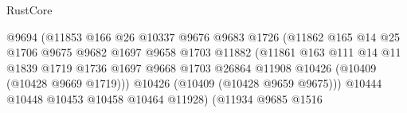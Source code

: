 \begin{lexlean}{RustCore}
\begin{coremodule}
                                                @9694
                                                (@11853
                                                  @166
                                                  @26
                                                  @10337
                                                  @9676
                                                  @9683
                                                  @1726
                                                  (@11862
                                                    @165
                                                    @14
                                                    @25
                                                    @1706
                                                    @9675
                                                    @9682
                                                    @1697
                                                    @9658
                                                    @1703
                                                    @11882
                                                    (@11861
                                                      @163
                                                      @111
                                                      @14
                                                      @11
                                                      @1839
                                                      @1719
                                                      @1736
                                                      @1697
                                                      @9668
                                                      @1703
                                                      @26864
                                                      @11908
                                                      @10426
                                                      (@10409 (@10428 @9669 @1719)))
                                                    @10426
                                                    (@10409 (@10428 @9659 @9675)))
                                                  @10444
                                                  @10448
                                                  @10453
                                                  @10458
                                                  @10464
                                                  @11928)
                                                (@11934
                                                  @9685
                                                  @1516

\end{coremodule}
\end{lexlean}
